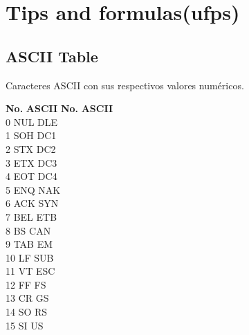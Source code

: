 \documentclass[10pt,landscape,twocolumn,a4paper,notitlepage]{article}
\begin{document}
	\newpage
	\section{Tips and formulas(ufps)}

\subsection{ASCII Table}
Caracteres ASCII con sus respectivos valores numéricos.


\begin{tabbing}
\textbf{No.}\hspace{1cm} \=  \textbf{ASCII}\hspace{2cm} \= \textbf{No.}\hspace{1cm} \= \textbf{ASCII}\hspace{2cm}  \\ 
0 \> NUL  \> DLE \\
1 \> SOH  \> DC1 \\
2 \> STX  \> DC2 \\
3 \> ETX  \> DC3 \\
4 \> EOT  \> DC4 \\
5 \> ENQ  \> NAK \\
6 \> ACK  \> SYN \\
7 \> BEL  \> ETB \\
8 \> BS  \> CAN \\
9 \> TAB  \> EM \\
10 \> LF  \> SUB \\
11 \> VT  \> ESC \\
12 \> FF  \> FS \\
13 \> CR  \> GS \\
14 \> SO  \> RS \\
15 \> SI  \> US \\ 
\end{tabbing}
\end{document}
